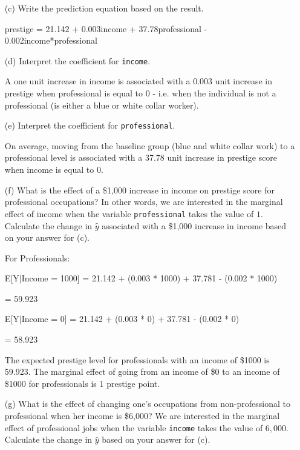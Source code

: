 \documentclass[12pt,letterpaper]{article}
\begin{document}
\begin{enumerate}
	\newpage
	\item [(c)]
	Write the prediction equation based on the result.
	
	\noindent
	prestige = 21.142 + 0.003income + 37.78professional - 0.002income*professional
	\vspace*{2cm}

	\item [(d)]
	Interpret the coefficient for \texttt{income}.
	
	\noindent
	A one unit increase in income is associated with a 0.003 unit increase in prestige when professional is equal to 0 - i.e. when the individual is not a professional (is either a blue or 
	white collar worker).
	
	\vspace{2cm}	
	\item [(e)]
	Interpret the coefficient for \texttt{professional}.
	
	\noindent
	On average, moving from the baseline group (blue and white collar work) to a professional level is associated with a 37.78 unit increase in prestige score when income is equal to 0.
	
	\vspace{2cm}	
	\item [(f)]
	What is the effect of a \$1,000 increase in income on prestige score for professional occupations? In other words, we are interested in the marginal effect of income when the variable \texttt{professional} takes the value of $1$. Calculate the change in $\hat{y}$ associated with a \$1,000 increase in income based on your answer for (c).
	

	\noindent
	
	For Professionals: 
	
	E[Y$|$Income = 1000] = 21.142 + (0.003 * 1000) + 37.781 - (0.002 * 1000)
	
	= 59.923
	
	\vspace*{0.5cm}
	E[Y$|$Income = 0] = 21.142 + (0.003 * 0) + 37.781 - (0.002 * 0)
	
	= 58.923
	
	\vspace*{0.5cm}
	The expected prestige level for professionals with an income of \$1000 is 59.923. The marginal effect of going from an income of \$0 to an income of \$1000 for professionals is 1 prestige point.
	
	\vspace{10cm}
	
	
	\item [(g)]
	What is the effect of changing one's occupations from non-professional to professional when her income is \$6,000? We are interested in the marginal effect of professional jobs when the variable \texttt{income} takes the value of $6,000$. Calculate the change in $\hat{y}$ based on your answer for (c).
	

\end{enumerate}
\end{document}
